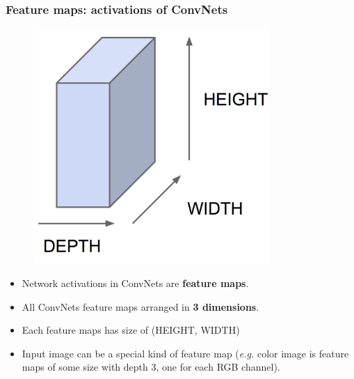 \documentclass{beamer}
\begin{document}
\begin{frame}
  \frametitle{Feature maps: activations of ConvNets}

  \begin{minipage}{0.48\textwidth}
    \begin{figure}[!htm]
      \includegraphics[width=0.8\textwidth]{feature_maps.png}
    \end{figure}
  \end{minipage}
  \begin{minipage}{0.48\textwidth}
    \begin{itemize}
      \item Network activations in ConvNets are \textbf{feature maps}.
      \item All ConvNets feature maps arranged in \textbf{3 dimensions}.
      \item Each feature maps has size of (HEIGHT, WIDTH)
      \item Input image can be a special kind of feature map (\emph{e.g.} color image is feature maps of some size with depth 3, one for each RGB channel).
    \end{itemize}
  \end{minipage}
\end{frame}
\end{document}
